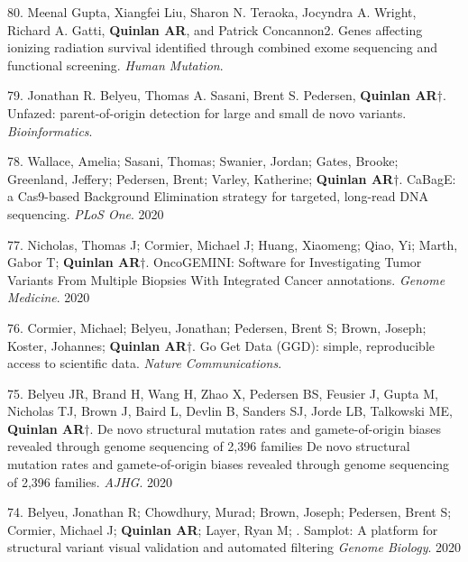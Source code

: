 \documentclass[margin,line]{cv}
\begin{document}
\begin{resume}
\begin{list}{*}{}
    \item[80.] Meenal Gupta, Xiangfei Liu, Sharon N. Teraoka, Jocyndra A. Wright, Richard A. Gatti, \textbf{Quinlan AR}, and Patrick Concannon2. Genes affecting ionizing radiation survival identified through combined exome sequencing and functional screening. \emph{Human Mutation}. 

    \item[79.] Jonathan R. Belyeu, Thomas A. Sasani, Brent S. Pedersen, \textbf{Quinlan AR}$\dagger$. Unfazed: parent-of-origin detection for large and small de novo variants. \emph{Bioinformatics}. 

    \item[78.] Wallace, Amelia; Sasani, Thomas; Swanier, Jordan; Gates, Brooke; Greenland, Jeffery; Pedersen, Brent; Varley, Katherine; \textbf{Quinlan AR}$\dagger$.  CaBagE: a Cas9-based Background Elimination strategy for targeted, long-read DNA sequencing. \emph{PLoS One}. 2020

    \item[77.] Nicholas, Thomas J; Cormier, Michael J; Huang, Xiaomeng; Qiao, Yi; Marth, Gabor T; \textbf{Quinlan AR}$\dagger$.  OncoGEMINI: Software for Investigating Tumor Variants From Multiple Biopsies With Integrated Cancer annotations. \emph{Genome Medicine}. 2020

    \item[76.] Cormier, Michael; Belyeu, Jonathan; Pedersen, Brent S; Brown, Joseph; Koster, Johannes; \textbf{Quinlan AR}$\dagger$. Go Get Data (GGD): simple, reproducible access to scientific data. \emph{Nature Communications}. 

    \item[75.] Belyeu JR, Brand H, Wang H, Zhao X, Pedersen BS, Feusier J, Gupta M, Nicholas TJ, Brown J, Baird L, Devlin B, Sanders SJ, Jorde LB, Talkowski ME, \textbf{Quinlan AR}$\dagger$. De novo structural mutation rates and gamete-of-origin biases revealed through genome sequencing of 2,396 families De novo structural mutation rates and gamete-of-origin biases revealed through genome sequencing of 2,396 families. \emph{AJHG}. 2020

    \item[74.] Belyeu, Jonathan R; Chowdhury, Murad; Brown, Joseph; Pedersen, Brent S; Cormier, Michael J; \textbf{Quinlan AR}; Layer, Ryan M; . Samplot: A platform for structural variant visual validation and automated filtering \emph{Genome Biology}. 2020
   

    \end{list}  


\end{resume}
\end{document}
